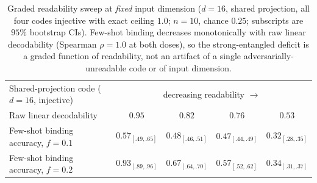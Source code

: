 \documentclass[10pt]{article} %
\begin{document}
\begin{table}[h]
\centering\small
\begin{tabular}{lcccc}
\toprule
Shared-projection code ($d{=}16$, injective) & \multicolumn{4}{c}{decreasing readability $\rightarrow$}\\
Raw linear decodability & $0.95$ & $0.82$ & $0.76$ & $0.53$\\
\midrule
Few-shot binding accuracy, $f{=}0.1$ & $0.57_{[.49,.65]}$ & $0.48_{[.46,.51]}$ & $0.47_{[.44,.49]}$ & $0.32_{[.28,.35]}$\\
Few-shot binding accuracy, $f{=}0.2$ & $0.93_{[.89,.96]}$ & $0.67_{[.64,.70]}$ & $0.57_{[.52,.62]}$ & $0.34_{[.31,.37]}$\\
\bottomrule
\end{tabular}
\caption{Graded readability sweep at \emph{fixed} input dimension ($d{=}16$, shared projection, all
four codes injective with exact ceiling $1.0$; $n{=}10$, chance $0.25$; subscripts are $95\%$
bootstrap CIs). Few-shot binding decreases monotonically with raw linear decodability (Spearman
$\rho{=}1.0$ at both doses), so the
strong-entangled deficit is a graded function of readability, not an artifact of a single
adversarially-unreadable code or of input dimension.}
\label{tab:readsweep}
\end{table}
\end{document}
